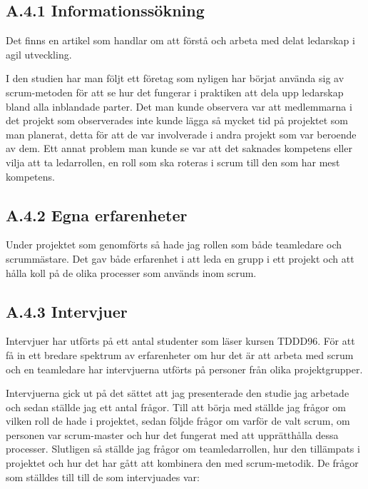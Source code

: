 \subsection{A.4.1 Informationssökning}
Det finns en artikel som handlar om att förstå och arbeta med delat ledarskap i agil utveckling. \cite{sharedleader}

I den studien har man följt ett företag som nyligen har börjat använda sig av scrum-metoden för att se hur det fungerar i praktiken att dela upp ledarskap bland alla inblandade parter. Det man kunde observera var att medlemmarna i det projekt som observerades inte kunde lägga så mycket tid på projektet som man planerat, detta för att de var involverade i andra projekt som var beroende av dem. Ett annat problem man kunde se var att det saknades kompetens eller vilja att ta ledarrollen, en roll som ska roteras i scrum till den som har mest kompetens. \cite{sharedleader}

\subsection{A.4.2 Egna erfarenheter}
Under projektet som genomförts så hade jag rollen som både teamledare och scrummästare. Det gav både erfarenhet i att leda en grupp i ett projekt och att hålla koll på de olika processer som används inom scrum.

\subsection{A.4.3 Intervjuer}
Intervjuer har utförts på ett antal studenter som läser kursen TDDD96. För att få in ett bredare spektrum av erfarenheter om hur det är att arbeta med scrum och en teamledare har intervjuerna utförts på personer från olika projektgrupper.

Intervjuerna gick ut på det sättet att jag presenterade den studie jag arbetade och sedan ställde jag ett antal frågor. Till att börja med ställde jag frågor om vilken roll de hade i projektet, sedan följde frågor om varför de valt scrum, om personen var scrum-master och hur det fungerat med att upprätthålla dessa processer. Slutligen så ställde jag frågor om teamledarrollen, hur den tillämpats i projektet och hur det har gått att kombinera den med scrum-metodik. De frågor som ställdes till till de som intervjuades var:

